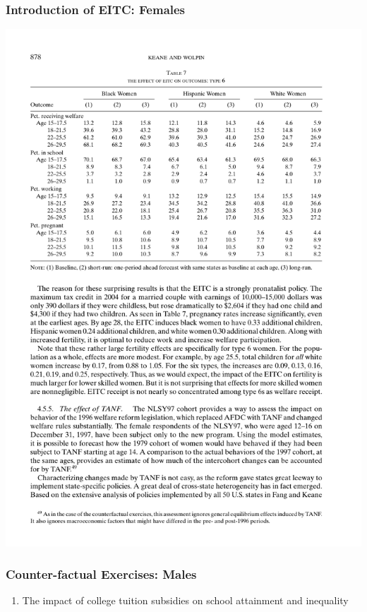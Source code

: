 \begin{frame}
	\frametitle{Introduction of EITC: Females}
		\includegraphics[width=\textwidth]{tab-figs/table7_2010}
\end{frame}

\begin{frame}
	\frametitle{Counter-factual Exercises: Males}
		\begin{enumerate}
			\item The impact of college tuition subsidies on school attainment and inequality
		\end{enumerate}
\end{frame}

